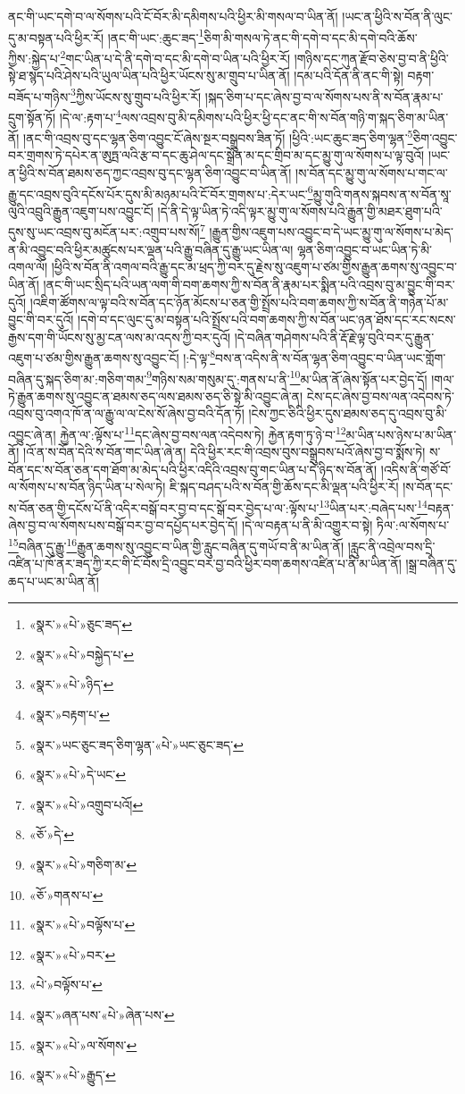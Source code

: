 ནང་གི་ཡང་དགེ་བ་ལ་སོགས་པའི་ངོ་བོར་མི་དམིགས་པའི་ཕྱིར་མི་གསལ་བ་ཡིན་ནོ། །ཡང་ན་ཕྱིའི་ས་བོན་ནི་ལུང་དུ་མ་བསྟན་པའི་ཕྱིར་རོ། །ནང་གི་ཡང་:ཆུང་ཟད་\footnote{«སྣར་»«པེ་»ཅུང་ཟད་}ཅིག་མི་གསལ་ཏེ་ནང་གི་དགེ་བ་དང་མི་དགེ་བའི་ཆོས་ཀྱིས་:སྐྱེད་པ་\footnote{«སྣར་»«པེ་»བསྐྱེད་པ་}གང་ཡིན་པ་དེ་ནི་དགེ་བ་དང་མི་དགེ་བ་ཡིན་པའི་ཕྱིར་རོ། །གཉིས་དང་ཀུན་རྫོབ་ཅེས་བྱ་བ་ནི་ཕྱིའི་སྟེ་ཐ་སྙད་པའི་ཤེས་པའི་ཡུལ་ཡིན་པའི་ཕྱིར་ཡོངས་སུ་མ་གྲུབ་པ་ཡིན་ནོ། །དམ་པའི་དོན་ནི་ནང་གི་སྟེ། བརྟག་བཟོད་པ་གཉིས་\footnote{«སྣར་»«པེ་»ཉིད་}ཀྱིས་ཡོངས་སུ་གྲུབ་པའི་ཕྱིར་རོ། །སྐད་ཅིག་པ་དང་ཞེས་བྱ་བ་ལ་སོགས་པས་ནི་ས་བོན་རྣམ་པ་དྲུག་སྟོན་ཏོ། །དེ་ལ་:རྟག་པ་\footnote{«སྣར་»བརྟག་པ་}ལས་འབྲས་བུ་མི་དམིགས་པའི་ཕྱིར་ཕྱི་དང་ནང་གི་ས་བོན་གཉི་ག་སྐད་ཅིག་མ་ཡིན་ནོ། །ནང་གི་འབྲས་བུ་དང་ལྷན་ཅིག་འབྱུང་ངོ་ཞེས་སྔར་བསྒྲུབས་ཟིན་ཏོ། །ཕྱིའི་:ཡང་ཆུང་ཟད་ཅིག་ལྷན་\footnote{«སྣར་»ཡང་ཅུང་ཟད་ཅིག་ལྷན་«པེ་»ཡང་ཅུང་ཟད་}ཅིག་འབྱུང་བར་གྲགས་ཏེ་དཔེར་ན་ཨུཏྤ་ལའི་རྩ་བ་དང་ཆུ་ཤེལ་དང་སྒྲོན་མ་དང་གྲིབ་མ་དང་མྱུ་གུ་ལ་སོགས་པ་ལྟ་བུའོ། །ཡང་ན་ཕྱིའི་ས་བོན་ཐམས་ཅད་ཀྱང་འབྲས་བུ་དང་ལྷན་ཅིག་འབྱུང་བ་ཡིན་ནོ། །ས་བོན་དང་མྱུ་གུ་ལ་སོགས་པ་གང་ལ་རྒྱུ་དང་འབྲས་བུའི་དངོས་པོར་དུས་མི་མཉམ་པའི་ངོ་བོར་གྲགས་པ་:དེར་ཡང་\footnote{«སྣར་»«པེ་»དེ་ཡང་}མྱུ་གུའི་གནས་སྐབས་ན་ས་བོན་སཱ་ལུའི་འབྲུའི་རྒྱུན་འཇུག་པས་འབྱུང་ངོ། །དེ་ནི་དེ་ལྟ་ཡིན་ཏེ་འདི་ལྟར་མྱུ་གུ་ལ་སོགས་པའི་རྒྱུན་གྱི་མཐར་ཐུག་པའི་དུས་སུ་ཡང་འབྲས་བུ་མངོན་པར་:འགྲུབ་པས་སོ།\footnote{«སྣར་»«པེ་»འགྲུབ་པའོ།} །རྒྱུན་གྱིས་འཇུག་པས་འབྱུང་བ་དེ་ཡང་མྱུ་གུ་ལ་སོགས་པ་མེད་ན་མི་འབྱུང་བའི་ཕྱིར་མཚུངས་པར་ལྡན་པའི་རྒྱུ་བཞིན་དུ་རྒྱུ་ཡང་ཡིན་ལ། ལྷན་ཅིག་འབྱུང་བ་ཡང་ཡིན་ཏེ་མི་འགལ་ལོ། །ཕྱིའི་ས་བོན་ནི་འགལ་བའི་རྒྱུ་དང་མ་ཕྲད་ཀྱི་བར་དུ་རྗེས་སུ་འཇུག་པ་ཙམ་གྱིས་རྒྱུན་ཆགས་སུ་འབྱུང་བ་ཡིན་ནོ། །ནང་གི་ཡང་སྲིད་པའི་ཡན་ལག་གི་བག་ཆགས་ཀྱི་ས་བོན་ནི་རྣམ་པར་སྨིན་པའི་འབྲས་བུ་མ་བྱུང་གི་བར་དུའོ། །འཇིག་ཚོགས་ལ་ལྟ་བའི་ས་བོན་དང་ཉོན་མོངས་པ་ཅན་གྱི་སྤྲོས་པའི་བག་ཆགས་ཀྱི་ས་བོན་ནི་གཉེན་པོ་མ་བྱུང་གི་བར་དུའོ། །དགེ་བ་དང་ལུང་དུ་མ་བསྟན་པའི་སྤྲོས་པའི་བག་ཆགས་ཀྱི་ས་བོན་ཡང་ཉན་ཐོས་དང་རང་སངས་རྒྱས་དག་གི་ཡོངས་སུ་མྱ་ངན་ལས་མ་འདས་ཀྱི་བར་དུའོ། །དེ་བཞིན་གཤེགས་པའི་ནི་རྡོ་རྗེ་ལྟ་བུའི་བར་དུ་རྒྱུན་འཇུག་པ་ཙམ་གྱིས་རྒྱུན་ཆགས་སུ་འབྱུང་ངོ། །:དེ་ལྟ་\footnote{«ཅོ་»དེ་}བས་ན་འདིས་ནི་ས་བོན་ལྷན་ཅིག་འབྱུང་བ་ཡིན་ཡང་གློག་བཞིན་དུ་སྐད་ཅིག་མ་:གཅིག་གམ་\footnote{«སྣར་»«པེ་»གཅིག་མ་}གཉིས་སམ་གསུམ་དུ་:གནས་པ་ནི་\footnote{«ཅོ་»གནས་པ་}མ་ཡིན་ནོ་ཞེས་སྟོན་པར་བྱེད་དོ། །གལ་ཏེ་རྒྱུན་ཆགས་སུ་འབྱུང་ན་ཐམས་ཅད་ལས་ཐམས་ཅད་ཅི་སྟེ་མི་འབྱུང་ཞེ་ན། ངེས་དང་ཞེས་བྱ་བས་ལན་འདེབས་ཏེ་འབྲས་བུ་འགའ་ཁོ་ན་ལ་རྒྱུ་ལ་ལ་ངེས་སོ་ཞེས་བྱ་བའི་དོན་ཏོ། །ངེས་ཀྱང་ཅིའི་ཕྱིར་དུས་ཐམས་ཅད་དུ་འབྲས་བུ་མི་འབྱུང་ཞེ་ན། རྐྱེན་ལ་:ལྟོས་པ་\footnote{«སྣར་»«པེ་»བལྟོས་པ་}དང་ཞེས་བྱ་བས་ལན་འདེབས་ཏེ། རྐྱེན་རྟག་ཏུ་ཉེ་བ་\footnote{«སྣར་»«པེ་»བར་}མ་ཡིན་པས་ཉེས་པ་མ་ཡིན་ནོ། །འོ་ན་ས་བོན་དེའི་ས་བོན་གང་ཡིན་ཞེ་ན། དེའི་ཕྱིར་རང་གི་འབྲས་བུས་བསྒྲུབས་པའོ་ཞེས་བྱ་བ་སྨོས་ཏེ། ས་བོན་དང་ས་བོན་ཅན་དག་ཐོག་མ་མེད་པའི་ཕྱིར་འདིའི་འབྲས་བུ་གང་ཡིན་པ་དེ་ཉིད་ས་བོན་ནོ། །འདིས་ནི་གཙོ་བོ་ལ་སོགས་པ་ས་བོན་ཉིད་ཡིན་པ་སེལ་ཏེ། ཇི་སྐད་བཤད་པའི་ས་བོན་གྱི་ཆོས་དང་མི་ལྡན་པའི་ཕྱིར་རོ། །ས་བོན་དང་ས་བོན་ཅན་གྱི་དངོས་པོ་ནི་འདིར་བསྒོ་བར་བྱ་བ་དང་སྒོ་བར་བྱེད་པ་ལ་:ལྟོས་པ་\footnote{«པེ་»བལྟོས་པ་}ཡིན་པར་:བཞེད་པས་\footnote{«སྣར་»ཞན་པས་«པེ་»ཞེན་པས་}བརྟན་ཞེས་བྱ་བ་ལ་སོགས་པས་བསྒོ་བར་བྱ་བ་དཔྱོད་པར་བྱེད་དོ། །དེ་ལ་བརྟན་པ་ནི་མི་འགྱུར་བ་སྟེ། ཏིལ་:ལ་སོགས་པ་\footnote{«སྣར་»«པེ་»ལ་སོགས་}བཞིན་དུ་རྒྱུ་\footnote{«སྣར་»«པེ་»རྒྱུད་}རྒྱུན་ཆགས་སུ་འབྱུང་བ་ཡིན་གྱི་རླུང་བཞིན་དུ་གཡོ་བ་ནི་མ་ཡིན་ནོ། །རླུང་ནི་འབྲེལ་བས་དྲི་འཛིན་པ་ཁོ་ནར་ཟད་ཀྱི་རང་གི་ངོ་བོས་དྲི་འབྱུང་བར་བྱ་བའི་ཕྱིར་བག་ཆགས་འཛིན་པ་ནི་མ་ཡིན་ནོ། །སྒྲ་བཞིན་དུ་ཆད་པ་ཡང་མ་ཡིན་ནོ། 